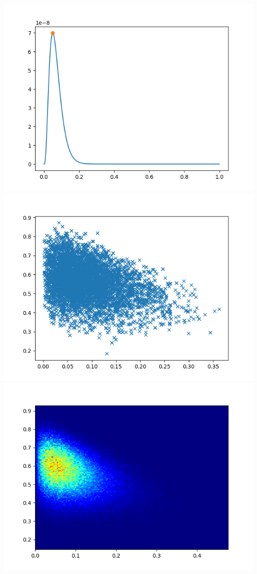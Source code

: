 \documentclass[pt12]{article}
\begin{document}
\newpage

\begin{center}
\includegraphics[scale=0.5]{hip11.png}\\
\includegraphics[scale=0.5]{sc11.png}\\
\includegraphics[scale=0.5]{den11.png}\\
\end{center}
\end{document}
